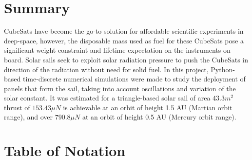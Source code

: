 
%
\section*{Summary}

CubeSats have become the go-to solution for affordable scientific experiments in deep-space, however, the disposable mass used as fuel for these CubeSats pose a significant weight constraint and lifetime expectation on the instruments on board. Solar sails seek to exploit solar radiation pressure to push the CubeSats in direction of the radiation without need for solid fuel. In this project, Python-based time-discrete numerical simulations were made to study the deployment of panels that form the sail, taking into account oscillations and variation of the solar constant. It was estimated for a triangle-based solar sail of area $43.3m^2$ thrust of $153.43\mu N$ is achievable at an orbit of height 1.5 AU (Martian orbit range), and over $790.8\mu N$ at an orbit of height 0.5 AU (Mercury orbit range).


\pagebreak
\tableofcontents

\pagebreak

\section*{Table of Notation}

